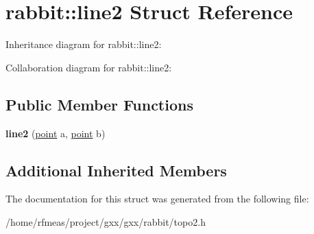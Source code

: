 \hypertarget{structrabbit_1_1line2}{}\section{rabbit\+:\+:line2 Struct Reference}
\label{structrabbit_1_1line2}


Inheritance diagram for rabbit\+:\+:line2\+:


Collaboration diagram for rabbit\+:\+:line2\+:
\subsection*{Public Member Functions}
\begin{DoxyCompactItemize}
\item 
{\bfseries line2} (\hyperlink{classmalgo_1_1vector2}{point} a, \hyperlink{classmalgo_1_1vector2}{point} b)\hypertarget{structrabbit_1_1line2_a5203ab9f11877533ef8c989ad4c30de7}{}\label{structrabbit_1_1line2_a5203ab9f11877533ef8c989ad4c30de7}

\end{DoxyCompactItemize}
\subsection*{Additional Inherited Members}


The documentation for this struct was generated from the following file\+:\begin{DoxyCompactItemize}
\item 
/home/rfmeas/project/gxx/gxx/rabbit/topo2.\+h\end{DoxyCompactItemize}
